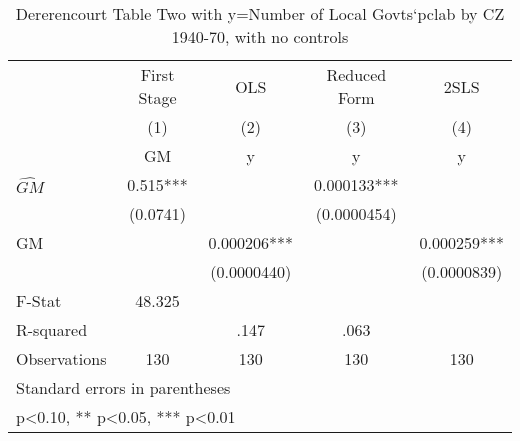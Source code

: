 \begin{table}[htbp]\centering
\def\sym#1{\ifmmode^{#1}\else\(^{#1}\)\fi}
\caption{Dererencourt Table Two with y=Number of Local Govts`pclab by CZ 1940-70, with no controls}
\begin{tabular}{l*{4}{c}}
\toprule
                    & First Stage   &         OLS   &Reduced Form   &        2SLS   \\
                    &\multicolumn{1}{c}{(1)}&\multicolumn{1}{c}{(2)}&\multicolumn{1}{c}{(3)}&\multicolumn{1}{c}{(4)}\\
                    &\multicolumn{1}{c}{GM}&\multicolumn{1}{c}{y}&\multicolumn{1}{c}{y}&\multicolumn{1}{c}{y}\\
\midrule
$\hat{GM}$          &       0.515***&               &    0.000133***&               \\
                    &    (0.0741)   &               & (0.0000454)   &               \\
\addlinespace
GM                  &               &    0.000206***&               &    0.000259***\\
                    &               & (0.0000440)   &               & (0.0000839)   \\
\midrule
F-Stat              &      48.325   &               &               &               \\
R-squared           &               &        .147   &        .063   &               \\
Observations        &         130   &         130   &         130   &         130   \\
\bottomrule
\multicolumn{5}{l}{\footnotesize Standard errors in parentheses}\\
\multicolumn{5}{l}{\footnotesize * p<0.10, ** p<0.05, *** p<0.01}\\
\end{tabular}
\end{table}
